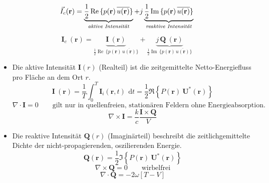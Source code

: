 \begin{equation}
\vec{I}_c (\mathbf{r}) = \underbrace{\frac{1}{2} \operatorname{Re} \, \{ p(\mathbf{r}) \, \overline{u(\mathbf{r})} \} }_{\textit{aktive Intensität}} +j \underbrace{\frac{1}{2} \operatorname{Im} \, \{ p(\mathbf{r}) \, \overline{u(\mathbf{r})} \} }_{\textit{\textit{reaktive~Intensität}}}
\end{equation}

\begin{equation}
	\mathbf{I}_c ~(\mathbf{r}) = \underbrace{\mathbf{I}~(\mathbf{r})}_{\frac{1}{2} \operatorname{Re} \, \{ p(\mathbf{r}) \, \overline{u(\mathbf{r})} \}} + \underbrace{j\,\mathbf{Q}~(\mathbf{r})}_{\frac{1}{2} \operatorname{Im} \, \{ p(\mathbf{r}) \, \overline{u(\mathbf{r})} \} }
\label{helmholtz:equationIntensitaetKomplex_2}
\end{equation}	

\begin{itemize}
\item Die aktive Intensität $\mathbf{I}(r)$ (Realteil) ist die zeitgemittelte Netto-Energiefluss pro Fläche an dem Ort $r$.
\begin{equation}
	\mathbf{I}~(\mathbf{r}) = \frac{1}{T}\int_0^T \mathbf{I}_i(\mathbf{r},t)\,~\mathrm{d}t = \frac{1}{2}\Re\left\{P(\mathbf{r})~\mathbf{U}^*(\mathbf{r})\right\}
	\end{equation}
\begin{equation}
	\nabla \cdot \mathbf{I} = 0 \qquad \text{gilt nur in quellenfreien, stationären Feldern ohne Energieabsorption.}
\end{equation}
\begin{equation}
	\nabla \times \mathbf{I} = \frac{k}{c} \frac{\mathbf{I} \times \mathbf{Q}}{V}
\end{equation}
\item Die reaktive Intensität $\mathbf{Q}(r)$ (Imaginärteil) beschreibt die zeitlichgemittelte Dichte der nicht-propagierenden, oszilierenden Energie. 
\begin{equation}
	\mathbf{Q}(\mathbf{r}) = \frac{1}{2}\Im\left\{P(\mathbf{r})~\mathbf{U}^*(\mathbf{r})\right\}
	\label{helmholtz:equationReaktiveIntensitaet}
	\end{equation}
\begin{equation}
	\nabla \times \mathbf{Q} = 0 \qquad \text{wirbelfrei}
\end{equation}
\begin{equation}
	\nabla \cdot \mathbf{Q} = -2 \omega [T-V]
\end{equation}
\end{itemize}